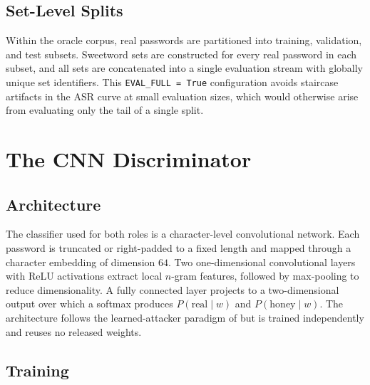 \subsection{Set-Level Splits}

Within the oracle corpus, real passwords are partitioned into training,
validation, and test subsets. Sweetword sets are constructed for every
real password in each subset, and all sets are concatenated into a
single evaluation stream with globally unique set identifiers. This
\texttt{EVAL\_FULL = True} configuration avoids staircase artifacts in
the ASR curve at small evaluation sizes, which would otherwise arise
from evaluating only the tail of a single split.

\section{The CNN Discriminator}
\label{sec:method-cnn}

\subsection{Architecture}

The classifier used for both roles is a character-level convolutional
network. Each password is truncated or right-padded to a fixed length
and mapped through a character embedding of dimension $64$. Two
one-dimensional convolutional layers with ReLU activations extract local
$n$-gram features, followed by max-pooling to reduce dimensionality. A
fully connected layer projects to a two-dimensional output over which a
softmax produces $P(\text{real} \mid w)$ and $P(\text{honey} \mid w)$.
The architecture follows the learned-attacker paradigm of
\textcite{dani2024passfilter} but is trained independently and reuses no
released weights.

\subsection{Training}

